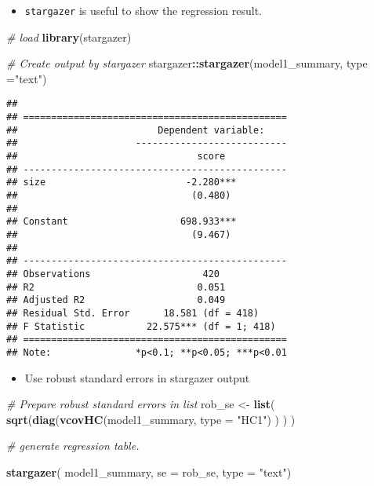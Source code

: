 \documentclass[]{book}
\newenvironment{Shaded}{\begin{snugshade}}{\end{snugshade}}
\newcommand{\KeywordTok}[1]{\textcolor[rgb]{0.13,0.29,0.53}{\textbf{#1}}}
\newcommand{\DataTypeTok}[1]{\textcolor[rgb]{0.13,0.29,0.53}{#1}}
\newcommand{\StringTok}[1]{\textcolor[rgb]{0.31,0.60,0.02}{#1}}
\newcommand{\CommentTok}[1]{\textcolor[rgb]{0.56,0.35,0.01}{\textit{#1}}}
\newcommand{\OperatorTok}[1]{\textcolor[rgb]{0.81,0.36,0.00}{\textbf{#1}}}
\newcommand{\NormalTok}[1]{#1}
\providecommand{\tightlist}{%
  \setlength{\itemsep}{0pt}\setlength{\parskip}{0pt}}
\begin{document}
\begin{itemize}
\tightlist
\item
  \texttt{stargazer} is useful to show the regression result.
\end{itemize}

\begin{Shaded}
\begin{Highlighting}[]
\CommentTok{# load}
\KeywordTok{library}\NormalTok{(stargazer)}

\CommentTok{# Create output by stargazer}
\NormalTok{stargazer}\OperatorTok{::}\KeywordTok{stargazer}\NormalTok{(model1_summary, }\DataTypeTok{type =}\StringTok{"text"}\NormalTok{)}
\end{Highlighting}
\end{Shaded}

\begin{verbatim}
## 
## ===============================================
##                         Dependent variable:    
##                     ---------------------------
##                                score           
## -----------------------------------------------
## size                         -2.280***         
##                               (0.480)          
##                                                
## Constant                    698.933***         
##                               (9.467)          
##                                                
## -----------------------------------------------
## Observations                    420            
## R2                             0.051           
## Adjusted R2                    0.049           
## Residual Std. Error      18.581 (df = 418)     
## F Statistic           22.575*** (df = 1; 418)  
## ===============================================
## Note:               *p<0.1; **p<0.05; ***p<0.01
\end{verbatim}

\begin{itemize}
\tightlist
\item
  Use robust standard errors in stargazer output
\end{itemize}

\begin{Shaded}
\begin{Highlighting}[]
\CommentTok{# Prepare robust standard errors in list}
\NormalTok{rob_se <-}\StringTok{ }\KeywordTok{list}\NormalTok{( }\KeywordTok{sqrt}\NormalTok{(}\KeywordTok{diag}\NormalTok{(}\KeywordTok{vcovHC}\NormalTok{(model1_summary, }\DataTypeTok{type =} \StringTok{"HC1"}\NormalTok{) ) ) ) }

\CommentTok{# generate regression table. }

\KeywordTok{stargazer}\NormalTok{( model1_summary, }
           \DataTypeTok{se =}\NormalTok{ rob_se, }
           \DataTypeTok{type =} \StringTok{"text"}\NormalTok{)}
\end{Highlighting}
\end{Shaded}
\end{document}
